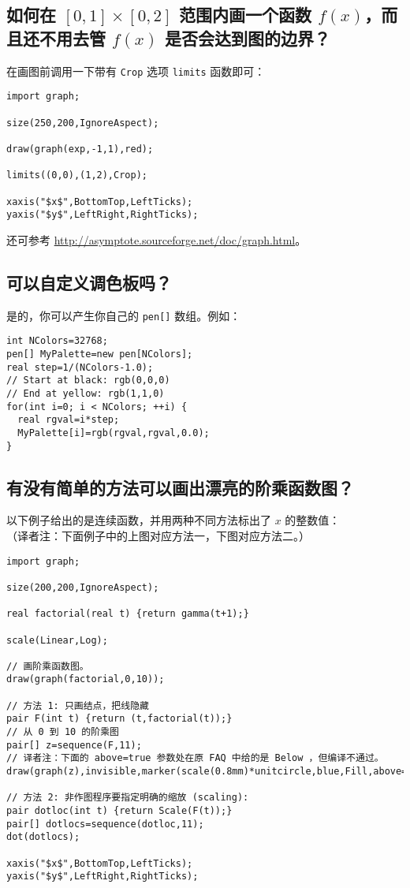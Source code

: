 \subsection{\label{Q6.9}如何在 $[0,1]\times[0,2]$ 范围内画一个函数 $f(x)$，而且还不用去管 $f(x)$ 是否会达到图的边界？}
在画图前调用一下带有 \verb|Crop| 选项 \verb|limits| 函数即可：
\begin{lstlisting}
import graph;

size(250,200,IgnoreAspect);

draw(graph(exp,-1,1),red);

limits((0,0),(1,2),Crop);

xaxis("$x$",BottomTop,LeftTicks);
yaxis("$y$",LeftRight,RightTicks);
\end{lstlisting}

还可参考 \url{http://asymptote.sourceforge.net/doc/graph.html}。


\subsection{\label{Q6.10}可以自定义调色板吗？}
是的，你可以产生你自己的 \verb|pen[]| 数组。例如：

\begin{lstlisting}
int NColors=32768;
pen[] MyPalette=new pen[NColors];
real step=1/(NColors-1.0);
// Start at black: rgb(0,0,0) 
// End at yellow: rgb(1,1,0) 
for(int i=0; i < NColors; ++i) { 
  real rgval=i*step;
  MyPalette[i]=rgb(rgval,rgval,0.0);
} 
\end{lstlisting}

\subsection{\label{Q6.11}有没有简单的方法可以画出漂亮的阶乘函数图？}
以下例子给出的是连续函数，并用两种不同方法标出了 $x$ 的整数值：\\
（译者注：下面例子中的上图对应方法一，下图对应方法二。）
\begin{lstlisting}
import graph;
 
size(200,200,IgnoreAspect);
 
real factorial(real t) {return gamma(t+1);} 
 
scale(Linear,Log);
 
// 画阶乘函数图。
draw(graph(factorial,0,10));
 
// 方法 1: 只画结点，把线隐藏
pair F(int t) {return (t,factorial(t));} 
// 从 0 到 10 的阶乘图
pair[] z=sequence(F,11);
// 译者注：下面的 above=true 参数处在原 FAQ 中给的是 Below ，但编译不通过。
draw(graph(z),invisible,marker(scale(0.8mm)*unitcircle,blue,Fill,above=true));
 
// 方法 2: 非作图程序要指定明确的缩放 (scaling):
pair dotloc(int t) {return Scale(F(t));} 
pair[] dotlocs=sequence(dotloc,11);
dot(dotlocs);
 
xaxis("$x$",BottomTop,LeftTicks);
yaxis("$y$",LeftRight,RightTicks);
\end{lstlisting}

